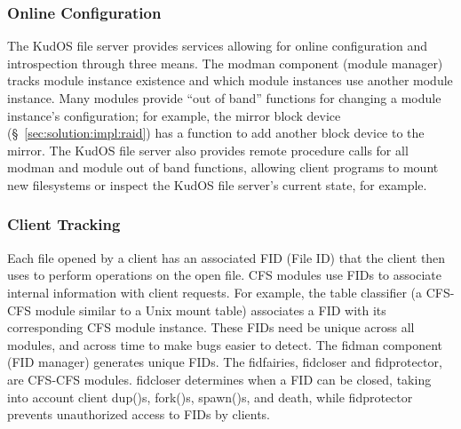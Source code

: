 \subsubsection{Online Configuration}
\label{sec:solution:arch:online}


The KudOS file server provides services allowing for online configuration
and introspection through three means. The modman component (module
manager) tracks module instance existence and which module instances use
another module instance. Many modules provide ``out of band'' functions for
changing a module instance's configuration; for example, the mirror block
device (\S~\ref{sec:solution:impl:raid}) has a function to add another block
device to the mirror. The KudOS file server also provides remote procedure
calls for all modman and module out of band functions, allowing client
programs to mount new filesystems or inspect the KudOS file server's
current state, for example.

\subsubsection{Client Tracking}
\label{sec:solution:arch:clients}

Each file opened by a client has an associated FID (File ID) that the client
then uses to perform operations on the open file. CFS modules use FIDs to
associate internal information with client requests. For example, the table
classifier (a CFS-CFS module similar to a Unix mount table) associates a FID
with its corresponding CFS module instance. These FIDs need be unique across all
modules, and across time to make bugs easier to detect. The fidman component
(FID manager) generates unique FIDs. The fidfairies, fidcloser and fidprotector,
are CFS-CFS modules. fidcloser determines when a FID can be closed, taking into
account client dup()s, fork()s, spawn()s, and death, while fidprotector prevents
unauthorized access to FIDs by clients.
